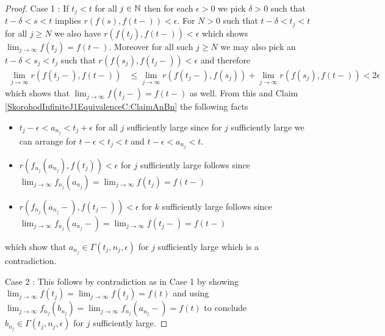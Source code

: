 \begin{proof}
Case 1 :  If $t_j < t$ for all $j \in \mathbb{N}$ then for each $\epsilon > 0$ we pick $\delta > 0$ such that $t - \delta < s < t$ implies $r(f(s), f(t-)) < \epsilon$.  For $N > 0$ such that
$t - \delta < t_j < t$ for all $j \geq N$ we also have $r(f(t_j), f(t-)) < \epsilon$ which shows $\lim_{j \to \infty} f(t_j) = f(t-)$.  Moreover for all such $j \geq N$ we may also pick an
$t - \delta < s_j < t_j$ such that $r(f(s_j), f(t_j-)) < \epsilon$ and therefore 
\begin{align*}
\lim_{j \to \infty} r(f(t_j-), f(t-)) &\leq \lim_{j \to \infty} r(f(t_j-), f(s_j)) + \lim_{j \to \infty} r(f(s_j), f(t-)) < 2 \epsilon
\end{align*}
which shows that $\lim_{j \to \infty} f(t_j-) = f(t-)$ as well.  From this and Claim \ref{SkorohodInfiniteJ1EquivalenceC:ClaimAnBn} the following facts
\begin{itemize}
\item $t_j - \epsilon < a_{n_j} < t_j + \epsilon$ for all $j$ sufficiently large since for $j$ sufficiently large we can arrange for $t - \epsilon < t_j < t$ and $t - \epsilon < a_{n_j} < t$.
\item $r(f_{n_j}(a_{n_j}), f(t_j)) < \epsilon$ for $j$ sufficiently large follows since $\lim_{j \to \infty} f_{n_j}(a_{n_j}) = \lim_{j \to \infty} f(t_j) = f(t-)$ 
\item $r(f_{n_j}(a_{n_j}-), f(t_j-)) < \epsilon$ for $k$ sufficiently large follows since $\lim_{j \to \infty} f_{n_j}(a_{n_j}-) = \lim_{j \to \infty} f(t_j-) = f(t-)$ 
\end{itemize}
which show that $a_{n_j} \in \Gamma(t_j,  n_j, \epsilon)$ for $j$ sufficiently large which is a contradiction.

Case 2 : This follows by contradiction as in Case 1 by showing $\lim_{j \to \infty} f(t_j) = \lim_{j \to \infty} f(t_j) = f(t)$ and using $\lim_{j \to \infty} f_{n_j}(b_{n_j}) = \lim_{j \to \infty} f_{n_j}(a_{n_j}-) = f(t)$ to conclude $b_{n_j} \in \Gamma(t_j, n_j, \epsilon)$ for $j$ sufficiently large.


\end{proof}
